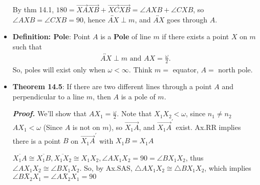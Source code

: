 \documentclass{report}
\begin{document}
\begin{itemize}
            \bigbreak \noindent 
            \bigbreak \noindent 
            By thm 14.1, $180 = \overrightarrow{XA}\overrightarrow{XB} + \overrightarrow{XC}\overrightarrow{XB} = \angle AXB + \angle CXB$, so $\angle AXB = \angle CXB = 90$, hence $\overleftrightarrow{AX} \perp m$, and $\overleftrightarrow{AX}$ goes through $A$. \endpf
        \item \textbf{Definition: Pole}: Point $A$ is a \textbf{Pole} of line $m$ if there exists a point $X$ on $m$ such that 
            \begin{align*}
                \overleftrightarrow{AX} \perp m \text{ and } AX = \frac{\omega}{2}
            .\end{align*}
            \bigbreak \noindent 
            \bigbreak \noindent 
            So, poles will exist only when $\omega < \infty$. Think $m=$ equator, $A=$ north pole.
            \bigbreak \noindent 
        \item \textbf{Theorem 14.5}: If there are two different lines through a point $A$ and perpendicular to a line $m$, then $A$ is a pole of $m$.
            \bigbreak \noindent 
            \begin{figure}[ht]
                \centering
                \label{fig:picture}
            \end{figure}
            \bigbreak \noindent 
            \textbf{\textit{Proof.}}  We'll show that $AX_{1} = \frac{\omega}{2}$. Note that $X_{1}X_{2} < \omega$, since $n_{1} \ne n_{2}$
            \bigbreak \noindent 
            $AX_{1} < \omega$ (Since $A$ is not on $m$), so $\overrightarrow{X_{1}A}$, and $ \overrightarrow{X_{1}A}^{\prime} $ exist. Ax.RR implies there is a point $B$ on $\overrightarrow{X_{1}A}^{\prime}$ with $X_{1}B = X_{1}A$
            \bigbreak \noindent 
            \begin{figure}[ht]
                \centering
                \label{fig:pic2}
            \end{figure}
            \bigbreak \noindent 
            $\overline{X_{1}A} \cong \overline{X_{1}B}, \overline{X_{1}X_{2}} \cong X_{1}X_{2}, \angle AX_{1}X_{2} = 90 = \angle BX_{1}X_{2}$, thus $\underline{\angle AX_{1}X_{2}} \cong\underline{\angle BX_{1}X_{2}}$. So, by Ax.SAS, $\triangle AX_{1}X_{2} \cong \triangle BX_{1}X_{2}$, which implies $ \angle BX_{2}X_{1} = \angle AX_{2}X_{1} = 90$
            \bigbreak \noindent 

\end{itemize}
\end{document}
